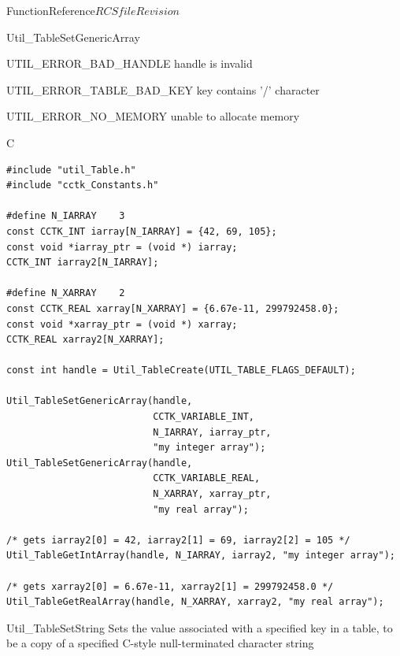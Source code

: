 \begin{cactuspart}{FunctionReference}{$RCSfile$}{$Revision$}
\begin{FunctionDescription}{Util\_TableSetGenericArray}
\begin{ErrorSection}
\begin{Error}{UTIL\_ERROR\_BAD\_HANDLE}
handle is invalid
\end{Error}
\begin{Error}{UTIL\_ERROR\_TABLE\_BAD\_KEY}
key contains '/' character
\end{Error}
\begin{Error}{UTIL\_ERROR\_NO\_MEMORY}
unable to allocate memory
\end{Error}
\end{ErrorSection}

\begin{ExampleSection}
\begin{Example}{C}
\begin{verbatim}
#include "util_Table.h"
#include "cctk_Constants.h"

#define N_IARRAY    3
const CCTK_INT iarray[N_IARRAY] = {42, 69, 105};
const void *iarray_ptr = (void *) iarray;
CCTK_INT iarray2[N_IARRAY];

#define N_XARRAY    2
const CCTK_REAL xarray[N_XARRAY] = {6.67e-11, 299792458.0};
const void *xarray_ptr = (void *) xarray;
CCTK_REAL xarray2[N_XARRAY];

const int handle = Util_TableCreate(UTIL_TABLE_FLAGS_DEFAULT);

Util_TableSetGenericArray(handle,
                          CCTK_VARIABLE_INT,
                          N_IARRAY, iarray_ptr,
                          "my integer array");
Util_TableSetGenericArray(handle,
                          CCTK_VARIABLE_REAL,
                          N_XARRAY, xarray_ptr,
                          "my real array");

/* gets iarray2[0] = 42, iarray2[1] = 69, iarray2[2] = 105 */
Util_TableGetIntArray(handle, N_IARRAY, iarray2, "my integer array");

/* gets xarray2[0] = 6.67e-11, xarray2[1] = 299792458.0 */
Util_TableGetRealArray(handle, N_XARRAY, xarray2, "my real array");
\end{verbatim}
\end{Example}
\end{ExampleSection}
\end{FunctionDescription}


\begin{FunctionDescription}{Util\_TableSetString}
\label{Util-TableSetString}
Sets the value associated with a specified key in a table, to be
a copy of a specified C-style null-terminated character string


\end{FunctionDescription}
\end{cactuspart}
